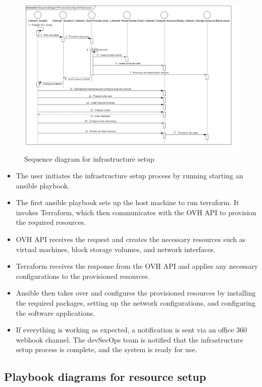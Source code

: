 \begin{figure}[H]\centering
\includegraphics[width=1.0\textwidth,angle=00]{assets/f16.png}
\caption{Sequence diagram for infrastructure setup}
\label{fig:Sequence diagram for infrastructure setup}
\end{figure}

\begin{itemize}[label={--}]
    \item The user initiates the infrastructure setup process by running starting an ansible playbook.
    \item The first ansible playbook sets up the host machine to run terraform. It invokes Terraform, which then communicates with the OVH API to provision the required resources.
    \item OVH API receives the request and creates the necessary resources such as virtual machines, block storage volumes, and network interfaces.
    \item Terraform receives the response from the OVH API and applies any necessary configurations to the provisioned resources.
    \item Ansible then takes over and configures the provisioned resources by installing the required packages, setting up the network configurations, and configuring the software applications.
    \item If everything is working as expected, a notification is sent via an office 360 webhook channel. The devSecOps team is notified that the infrastructure setup process is complete, and the system is ready for use.
\end{itemize}

\subsection{Playbook diagrams for resource setup}

